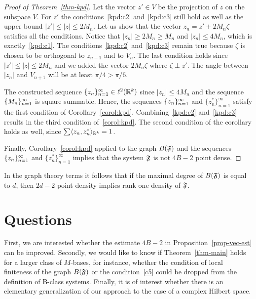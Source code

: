 \documentclass[12pt,oneside,a4paper]{amsart}
\begin{document}
\begin{proof}[Proof of Theorem~\ref{thm-kpd}]
        Let the vector $z' \in V$ be the projection of $z$ on the subspace $V$.
        For $z'$ the conditions~\ref{kpd:c2} and~\ref{kpd:c3} still hold as well as the upper bound
          $\lvert z'\rvert \leq \lvert z\rvert \leq 2 M_n$.
        Let us show that the vector $z_n = z' + 2 M_n \zeta$ satisfies all the conditions.
        Notice that $\lvert z_n \rvert \geq 2 M_n \geq M_n$ and $\lvert z_n \rvert \leq 4 M_n$,
          which is exactly~\ref{kpd:c1}.
        The conditions~\ref{kpd:c2} and~\ref{kpd:c3} remain true because $\zeta$ is chosen to be orthogonal to $z_{n - 1}$ and to $V_n$.
        The last condition holds since $\lvert z'\rvert \leq \lvert z \rvert \leq 2 M_n$ and we added the vector $2M_n \zeta$
          where $\zeta \perp z'$.
        The angle between $\lvert z_n\rvert$ and $V_{n+1}$ will be at least $\pi / 4 > \pi / 6$.
        \smallskip

        The constructed sequence $\{{z}_n\}_{n=1}^\infty \in \ell^2({\mathbb{R}^k})$
          since $\lvert z_n \rvert \leq 4M_n$ and the sequence $\{{M}_n\}_{n=1}^\infty$ is square summable.
        Hence, the sequences $\{{z}_n\}_{n=1}^\infty$ and $\{z_n^*\}_{n=1}^\infty$ satisfy the first condition of Corollary~\ref{corol:kpd}.
        Combining~\ref{kpd:c2} and~\ref{kpd:c3} results in the third condition of~\ref{corol:kpd}.
        The second condition of the corollary holds as well, since $\sum \langle z_n, z^*_n \rangle_{\mathbb{R}^k} = 1$.

        Finally, Corollary~\ref{corol:kpd} applied to the graph $B(\mathfrak{F})$ and the sequences $\{{z}_n\}_{n=1}^\infty$ and $\{z_n^*\}_{n=1}^\infty$ implies that the system $\mathfrak{F}$ is not $4B - 2$ point dense.
      \end{proof}
      \begin{remark*}
        In the graph theory terms it follows that if the maximal degree of $B(\mathfrak{F})$ is equal to $d$,
          then $2d - 2$ point density implies rank one density of $\mathfrak{F}$.
      \end{remark*}
  \bigskip
  \section{Questions}
    First, we are interested whether the estimate $4B - 2$ in Proposition~\eqref{prop-vec-est} can be improved.
    Secondly, we would like to know if Theorem~\ref{thm-main} holds for a larger class of $M$-bases, for instance, whether the condition of
      local finiteness of the graph $B(\mathfrak{F})$ or the condition~\ref{c5} could be dropped from the definition of B-class systems.
    Finally, it is of interest whether there is an elementary generalization of our approach to the case of a complex Hilbert space.
\end{document}
